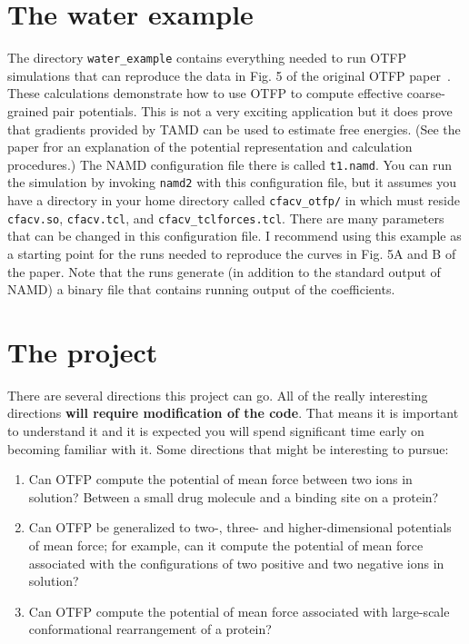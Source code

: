 \documentclass[11pt]{article}
\begin{document}
\section{The water example}

The directory {\tt water\_example} contains everything needed to run
OTFP simulations that can reproduce the data in Fig. 5 of the original
OTFP paper~\cite{Abrams2012}.  These calculations demonstrate how to
use OTFP to compute effective coarse-grained pair potentials.  This is
not a very exciting application but it does prove that gradients
provided by TAMD can be used to estimate free energies.  (See the
paper fror an explanation of the potential representation and
calculation procedures.)  The NAMD configuration file there is called
{\tt t1.namd}.  You can run the simulation by invoking {\tt namd2}
with this configuration file, but it assumes you have a directory in
your home directory called {\tt cfacv\_otfp/} in which must reside
{\tt cfacv.so}, {\tt cfacv.tcl}, and {\tt cfacv\_tclforces.tcl}.
There are many parameters that can be changed in this configuration
file.  I recommend using this example as a starting point for the runs
needed to reproduce the curves in Fig. 5A and B of the paper.  Note
that the runs generate (in addition to the standard output of NAMD) a
binary file that contains running output of the coefficients.

\section{The project}

There are several directions this project can go.  All of the really interesting directions {\bf will require modification of the code}.  That means it is important to understand it and it is expected you will spend significant time early on becoming familiar with it.  Some directions that might be interesting to pursue:

\begin{enumerate}
\item Can OTFP compute the potential of mean force between two ions in solution?  Between a small drug molecule and a binding site on a protein?  
\item Can OTFP be generalized to two-, three- and higher-dimensional
potentials of mean force; for example, can it compute the potential of mean force associated with the configurations of two positive and two negative ions in solution?
\item Can OTFP compute the potential of mean force associated with large-scale conformational rearrangement of a protein?
\end{enumerate}



\end{document}
